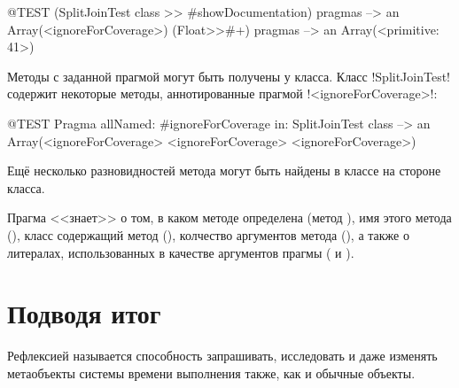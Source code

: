 \documentclass[a4paper,10pt,twoside]{book}
\begin{document}
\begin{code}{@TEST}
(SplitJoinTest class >> #showDocumentation) pragmas
  --> an Array(<ignoreForCoverage>)
(Float>>#+) pragmas --> an Array(<primitive: 41>)
\end{code}

Методы с заданной прагмой могут быть получены у класса. Класс \ct!SplitJoinTest! содержит некоторые методы, аннотированные прагмой \ct!<ignoreForCoverage>!:

\begin{code}{@TEST}
Pragma allNamed: #ignoreForCoverage in: SplitJoinTest class  --> an Array(<ignoreForCoverage> <ignoreForCoverage> <ignoreForCoverage>)
\end{code}

Ещё несколько разновидностей метода  могут быть найдены в классе  на стороне класса.

Прагма <<знает>> о том, в каком методе определена (метод ), имя этого метода (), класс содержащий метод (), колчество аргументов метода (), а также о литералах, использованных в качестве аргументов прагмы ( и ).


\section{Подводя итог}

Рефлексией называется способность запрашивать, исследовать и даже изменять метаобъекты системы времени выполнения также, как и обычные объекты.
\end{document}
